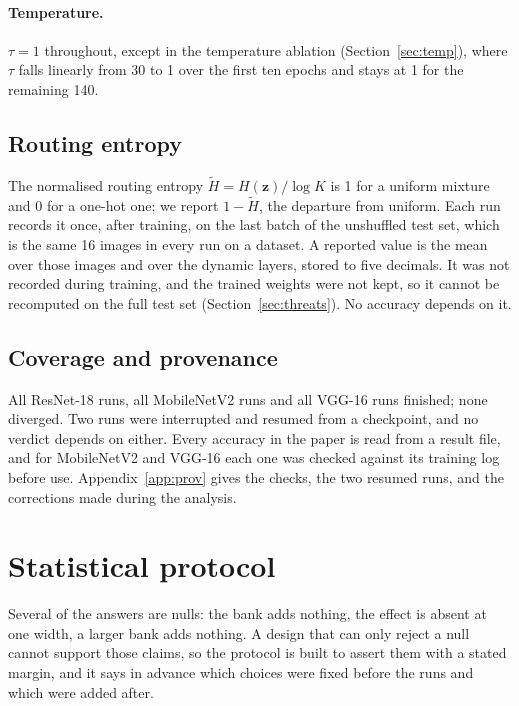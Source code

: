 \documentclass[10pt,a4paper]{article}
\newcommand{\zv}{\mathbf{z}}
\begin{document}
\paragraph{Temperature.} $\tau=1$ throughout, except in the temperature
ablation (Section~\ref{sec:temp}), where $\tau$ falls linearly from 30 to
1 over the first ten epochs and stays at 1 for the remaining 140.

\subsection{Routing entropy}\label{sec:entdef}

The normalised routing entropy $\tilde H=H(\zv)/\log K$ is 1 for a
uniform mixture and 0 for a one-hot one; we report $1-\tilde H$, the
departure from uniform. Each run records it once, after training, on the
last batch of the unshuffled test set, which is the same 16 images in
every run on a dataset. A reported value is the mean over those images
and over the dynamic layers, stored to five decimals. It was not recorded
during training, and the
trained weights were not kept, so it cannot be recomputed on the full
test set (Section~\ref{sec:threats}). No accuracy depends on it.

\subsection{Coverage and provenance}

All  ResNet-18 runs, all  MobileNetV2 runs and all
 VGG-16 runs finished; none diverged. Two runs were interrupted and
resumed from a checkpoint, and no verdict depends on either. Every accuracy
in the paper is read from a result file, and for MobileNetV2 and VGG-16 each
one was checked against its training log before use. Appendix~\ref{app:prov}
gives the checks, the two resumed runs, and the corrections made during the
analysis.

\section{Statistical protocol}\label{sec:stats}

Several of the answers are nulls: the bank adds nothing, the effect is
absent at one width, a larger bank adds nothing. A design that can only
reject a null cannot support those claims, so the protocol is built to
assert them with a stated margin, and it says in advance which choices were
fixed before the runs and which were added after.
\end{document}
